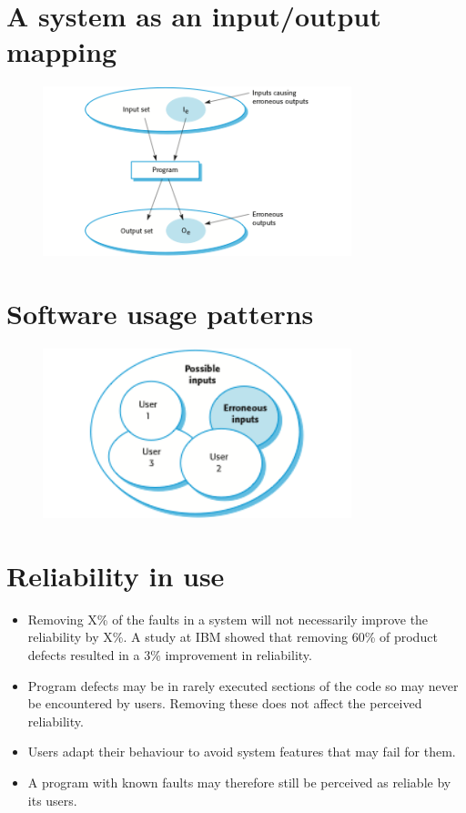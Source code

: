 \section{A system as an input/output mapping}
\begin{figure}[h!]
    \centering
    \includegraphics[width = 0.8\textwidth]{./figures/L4_3.png}
    \caption{}
    \label{fig:L4_3}
\end{figure}

\section{Software usage patterns}
\begin{figure}[h!]
    \centering
    \includegraphics[width = 0.8\textwidth]{./figures/L4_4.png}
    \caption{}
    \label{fig:L4_4}
\end{figure}

\section{Reliability in use}
\begin{itemize}
\item Removing X\% of the faults in a system will not necessarily improve the reliability by X\%. A study at IBM showed that removing 60\% of product defects resulted in a 3\% improvement in reliability.

\item Program defects may be in rarely executed sections of the code so may never be encountered by users. Removing these does not affect the perceived reliability.

\item Users adapt their behaviour to avoid system features that may fail for them.

\item A program with known faults may therefore still be perceived as reliable by its users.

\end{itemize}
